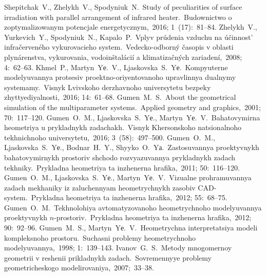 \documentclass[12pt,twoside]{article}
\begin{document}
\begin{JGGarticle}
\begin{thebibliography}{99}
				Shepitchak~V., Zhelykh~V., Spodyniuk~N.\ Study of peculiarities of surface irradiation with parallel arrangement of infrared heater.\ Budownictwo o zoptymalizowanym potencjale energetycznym,~2016; 1~(17):~81--84.
				Zhelykh~V., Yurkevich~Y., Spodyniuk~N., Kapalo~P.\ Vplyv pr\'udenia vzduchu na \'u\v cinnost' infra\v cerven\'eho vykurovacieho system.\ Vedecko-odborn\'y \v casopis v oblasti plyn\'arenstva, vykurovania, vodoin\v stal\'aci\'i a klimatiza\v cn\'ych zariaden\'i,~2008; 4:~62--63.
				Khmel~P., Martyn~Yе.~V., Ljaskovska~S.~Yе.\ Kompyuterne modelyuvannya protsesiv proektno-oriyentovanoho upravlinnya dualnymy systemamy.\ Visnyk Lvivskoho derzhavnoho universytetu bezpeky zhyttyediyalnosti,~2016; 14:~61--68.
				Gumen~M.~S.\ About the geometrical simulation of the multiparameter systems.\ Applied geometry and graphics,~2001; 70:~117--120.
				Gumen~O.~M., Ljaskovska~S.~Yе., Martyn~Yе.~V.\ Bahatovymirna heometriya u prykladnykh zadachakh.\ Visnyk Khersonskoho natsionalnoho tekhnichnoho universytetu,~2016; 3~(58):~497--500.
				Gumen~O.~M., Ljaskovska~S.~Yе., Bodnar~H.~Y., Shyyko~O.~Yа.\ Zastosuvannya proektyvnykh bahatovymirnykh prostoriv shchodo rozvyazuvannya prykladnykh zadach tekhniky.\ Prykladna heometriya ta inzhenerna hrafika,~2011; 50:~116--120.
				Gumen~O.~M., Ljaskovska~S.~Yе., Martyn~Yе.~V.\ Vizualne prohramuvannya zadach mekhaniky iz zaluchennyam heometrychnykh zasobiv CAD-system.\ Prykladna heometriya ta inzhenerna hrafika,~2012; 55:~68--75.
				Gumen~O.~M.\ Tekhnolohiya avtomatyzovanoho heometrychnoho modelyuvannya proektyvnykh $n$-prostoriv.\ Prykladna heometriya ta inzhenerna hrafika,~2012; 90:~92--96.
				Gumen~M.~S., Martyn~Yе.~V.\ Heometrychna interpretatsiya modeli kompleksnoho  prostoru.\ Suchasni problemy heometrychnoho modelyuvannya,~1998; 1:~139--143.
				Ivanov~G.~S.\ Metody mnogomernoy geometrii v reshenii prikladnykh zadach.\ Sovremennyye problemy geometricheskogo modelirovaniya,~2007;~33--38.
		\end{thebibliography}
	\end{JGGarticle}
\end{document}
